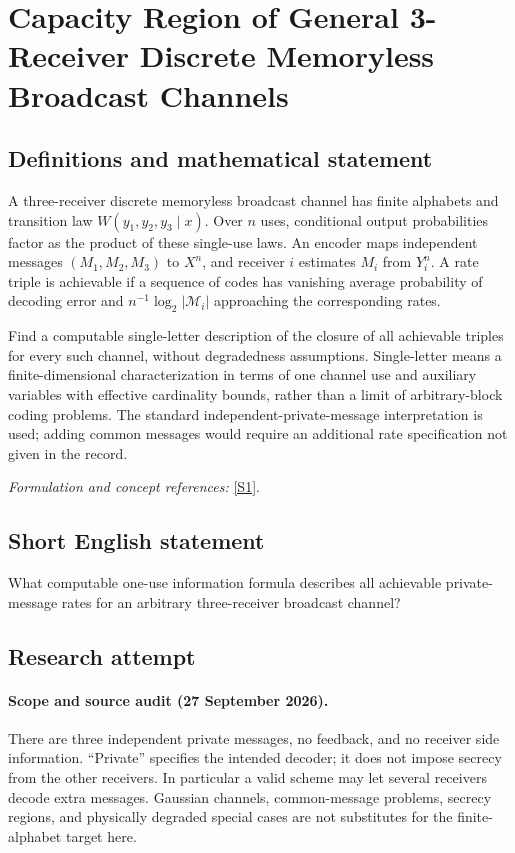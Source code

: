 \documentclass[11pt]{article}
\begin{document}
\section*{\texorpdfstring{Capacity Region of General 3-Receiver Discrete Memoryless Broadcast Channels}{Capacity Region of General 3-Receiver Discrete Memoryless Broadcast Channels}}\label{30006950}
\subsection{Definitions and mathematical statement}
A three-receiver discrete memoryless broadcast channel has finite alphabets and transition law $W(y_1,y_2,y_3\mid x)$. Over $n$ uses, conditional output probabilities factor as the product of these single-use laws. An encoder maps independent messages $(M_1,M_2,M_3)$ to $X^n$, and receiver $i$ estimates $M_i$ from $Y_i^n$. A rate triple is achievable if a sequence of codes has vanishing average probability of decoding error and $n^{-1}\log_2|\mathcal M_i|$ approaching the corresponding rates.

Find a computable single-letter description of the closure of all achievable triples for every such channel, without degradedness assumptions. Single-letter means a finite-dimensional characterization in terms of one channel use and auxiliary variables with effective cardinality bounds, rather than a limit of arbitrary-block coding problems. The standard independent-private-message interpretation is used; adding common messages would require an additional rate specification not given in the record.
\par\smallskip\textit{Formulation and concept references:} \href{https://doi.org/10.1017/CBO9780511978166}{[S1]}.

\subsection{Short English statement}
What computable one-use information formula describes all achievable private-message rates for an arbitrary three-receiver broadcast channel?
\subsection{Research attempt}
\paragraph{Scope and source audit (27 September 2026).}
There are three independent private messages, no feedback, and no receiver
side information. ``Private'' specifies the intended decoder; it does
not impose secrecy from the other receivers. In particular a valid scheme
may let several receivers decode extra messages. Gaussian channels,
common-message problems, secrecy regions, and physically degraded
special cases are not substitutes for the finite-alphabet target here.
\end{document}
